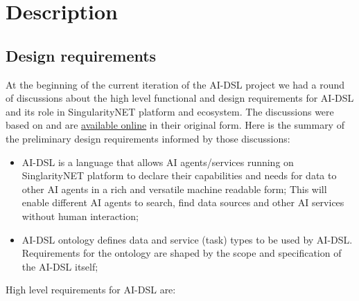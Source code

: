 \documentclass[]{report}
\begin{document}
\section{Description}

\subsection{Design requirements}
\label{sec:design-requirements}

At the beginning of the current iteration of the AI-DSL project we had a round
of discussions about the high level functional and design requirements for
AI-DSL and its role in SingularityNET platform and ecosystem. The discussions
were based on
\cite{GoertzelGeisweillerBlog,singularitynet_foundation_phasetwo_2021}  and are
\href{https://github.com/nunet-io/ai-dsl-ontology/wiki/AI-DSL\%20requirements}{available
online} in their original form. Here is the summary of the preliminary design
requirements informed by those discussions:

\begin{itemize} \item AI-DSL is a language that allows AI agents/services
running on SinglarityNET platform to declare their capabilities and needs for
data to other AI agents in a rich and versatile machine readable form; This will
enable different AI agents to search, find data sources and other AI services
without human interaction; \item AI-DSL ontology defines data and service
(task) types to be used by AI-DSL. Requirements for the ontology are shaped by
the scope and specification of the AI-DSL itself; \end{itemize}

High level requirements for AI-DSL are:
\end{document}
